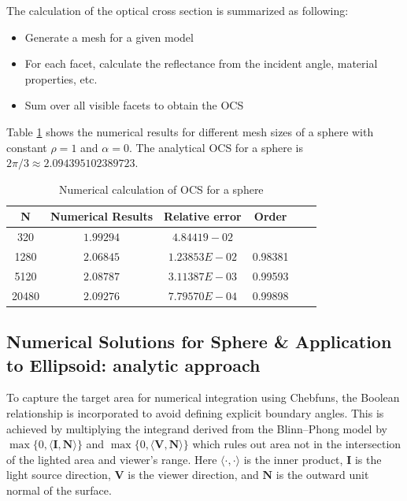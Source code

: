 \documentclass[11pt,reqno]{amsart}
\theoremstyle{definition}
\begin{document}
The calculation of the optical cross section is summarized as following:
\begin{itemize}
\item Generate a mesh for a given model
\item For each facet, calculate the reflectance from the incident angle, material properties, etc.
\item Sum over all visible facets to obtain the OCS
\end{itemize} 
Table \ref{table: sphere OCS} shows the numerical results for different mesh sizes of a sphere with constant $\rho=1$ and $\alpha=0$. The analytical OCS for a sphere is $2\pi/3\approx 2.094395102389723$.
\begin{table}[H]
	\small
	\caption{Numerical calculation of OCS for a sphere
	}
	\centering
	\begin{tabular}{|c|c|c|c|c|c|}
	\hline
	N & Numerical Results & Relative error & Order \\
	\hline
	320 & $1.99294$ & $4.84419-02$ &  \\
    \hline	
	1280 & $2.06845$ & $1.23853E-02$ & 0.98381 \\
    \hline	
	5120 & $2.08787$ & $3.11387E-03$ & 0.99593 \\
	\hline
	20480 & $2.09276$ & $7.79570E-04$ & 0.99898 \\
	\hline
	\end{tabular}
	\label{table: sphere OCS}
\end{table}
  
\subsection{Numerical Solutions for Sphere \& Application to Ellipsoid: analytic approach}
To capture the target area for numerical integration using Chebfuns, the Boolean
relationship is incorporated to avoid defining explicit boundary angles. This
is achieved by multiplying the integrand derived from the Blinn--Phong model by
$\max\{0, \langle \mathbf{I},\mathbf{N}\rangle\}$ and $\max\{0,\langle
\mathbf{V},\mathbf{N}\rangle\}$ which rules out area not in the intersection of
the lighted area and viewer's range. Here $\langle\cdot, \cdot\rangle$ is the
inner product, $\mathbf{I}$ is the light source direction, $\mathbf{V}$ is the
viewer direction, and $\mathbf{N}$ is the outward unit normal of the surface.
\end{document}

